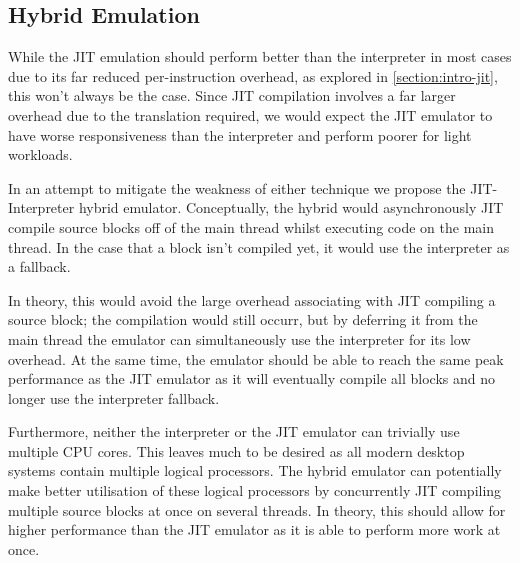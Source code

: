 \subsection{Hybrid Emulation}
\label{section:intro-hybrid}

While the JIT emulation should perform better than the interpreter in most cases due to its far reduced per-instruction overhead, as explored in \autoref{section:intro-jit}, this won't always be the case. Since JIT compilation involves a far larger overhead due to the translation required, we would expect the JIT emulator to have worse responsiveness than the interpreter and perform poorer for light workloads.

In an attempt to mitigate the weakness of either technique we propose the JIT-Interpreter hybrid emulator. Conceptually, the hybrid would asynchronously JIT compile source blocks off of the main thread whilst executing code on the main thread. In the case that a block isn't compiled yet, it would use the interpreter as a fallback.

In theory, this would avoid the large overhead associating with JIT compiling a source block; the compilation would still occurr, but by deferring it from the main thread the emulator can simultaneously use the interpreter for its low overhead. At the same time, the emulator should be able to reach the same peak performance as the JIT emulator as it will eventually compile all blocks and no longer use the interpreter fallback.

Furthermore, neither the interpreter or the JIT emulator can trivially use multiple CPU cores. This leaves much to be desired as all modern desktop systems contain multiple logical processors. The hybrid emulator can potentially make better utilisation of these logical processors by concurrently JIT compiling multiple source blocks at once on several threads. In theory, this should allow for higher performance than the JIT emulator as it is able to perform more work at once.